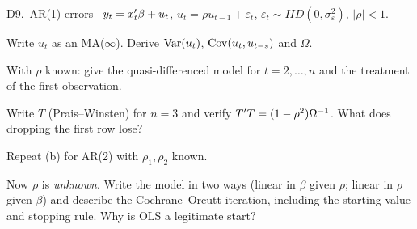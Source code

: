 \documentclass[11pt]{article}
\newcommand{\tagbox}[2]{\tcbox[on line, colback=#1, colframe=#1, coltext=white,
  boxsep=1pt, left=3pt, right=3pt, top=0pt, bottom=0pt, arc=1.5pt]{\scriptsize\sffamily\bfseries #2}}
\newcommand{\must}{\tagbox{examred}{$\star\star\star$ MUST}}
\newcommand{\newtag}{\tagbox{qnavy!60}{NEW}}
\begin{document}
\begin{qbox}{D9.\ AR(1) errors}{\must\ \newtag}
$y_{t}=x_{t}^{\prime}\beta+u_{t}$, $u_{t}=\rho u_{t-1}+\varepsilon_{t}$, $\varepsilon_{t}\sim IID(0,\sigma_{\varepsilon}^{2})$, $|\rho|<1$.
\begin{flatlist}
  \item[(a)] Write $u_{t}$ as an MA($\infty$). Derive $\operatorname{Var}(u_{t})$, $\operatorname{Cov}(u_{t},u_{t-s})$ and $\Omega$.
  \item[(b)] With $\rho$ known: give the quasi-differenced model for $t=2,\dots,n$ and the treatment of the first observation.
  \item[(c)] Write $T$ (Prais--Winsten) for $n=3$ and verify $T^{\prime} T=(1-\rho^{2})\Omega^{-1}$. What does dropping the first row lose?
  \item[(d)] Repeat (b) for AR(2) with $\rho_{1},\rho_{2}$ known.
  \item[(e)] Now $\rho$ is \emph{unknown}. Write the model in two ways (linear in $\beta$ given $\rho$; linear in $\rho$ given $\beta$) and describe
        the Cochrane--Orcutt iteration, including the starting value and stopping rule. Why is OLS a legitimate start?
\end{flatlist}
\end{qbox}
\end{document}
